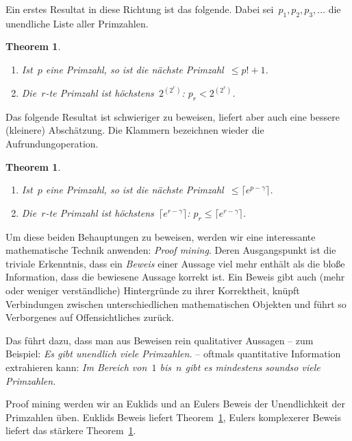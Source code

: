 \documentclass[twoside]{../zirkelblatt1415}
\theoremstyle{definition}
\theoremstyle{plain}
\newtheorem{thm}[defn]{Theorem}
\theoremstyle{remark}
\begin{document}
Ein erstes Resultat in diese Richtung ist das folgende. Dabei
sei~$p_1,p_2,p_3,\ldots$ die unendliche Liste aller Primzahlen.

\begin{thm}\label{thm:schranke1}\ \\[-2em]
\begin{enumerate}
\item
Ist~$p$ eine Primzahl, so ist die nächste Primzahl~$\leq p! + 1$. \\[-2em]
\item
Die~$r$-te Primzahl ist höchstens~$2^{(2^r)}$: $p_r < 2^{(2^r)}$.
\end{enumerate}
\end{thm}

Das folgende Resultat ist schwieriger zu beweisen, liefert aber auch eine
bessere (kleinere) Abschätzung. Die Klammern bezeichnen wieder die
Aufrundungoperation.

\begin{thm}\label{thm:schranke2}\ \\[-2em]
\begin{enumerate}
\item
Ist~$p$ eine Primzahl, so ist die nächste Primzahl~$\leq \lceil e^{p-\gamma}
\rceil$. \\[-2em]
\item
Die~$r$-te Primzahl ist höchstens~$\lceil e^{r-\gamma} \rceil$: $p_r
\leq \lceil e^{r-\gamma} \rceil$.
\end{enumerate}
\end{thm}

Um diese beiden Behauptungen zu beweisen, werden wir eine interessante
mathematische Technik anwenden: \emph{Proof mining}. Deren Ausgangspunkt ist
die triviale Erkenntnis, dass ein \emph{Beweis} einer Aussage viel mehr enthält
als die bloße Information, dass die bewiesene Aussage korrekt ist. Ein Beweis
gibt auch (mehr oder weniger verständliche) Hintergründe zu ihrer Korrektheit,
knüpft Verbindungen zwischen unterschiedlichen mathematischen Objekten und
führt so Verborgenes auf Offensichtliches zurück.

Das führt dazu, dass man aus Beweisen rein qualitativer Aussagen -- zum
Beispiel: \emph{Es gibt unendlich viele Primzahlen.} -- oftmals quantitative
Information extrahieren kann: \emph{Im Bereich von~$1$ bis~$n$ gibt es
mindestens soundso viele Primzahlen.}

Proof mining werden wir an Euklids und an Eulers Beweis der Unendlichkeit der
Primzahlen üben. Euklids Beweis liefert Theorem~\ref{thm:schranke1}, Eulers
komplexerer Beweis liefert das stärkere Theorem~\ref{thm:schranke2}.
\end{document}
